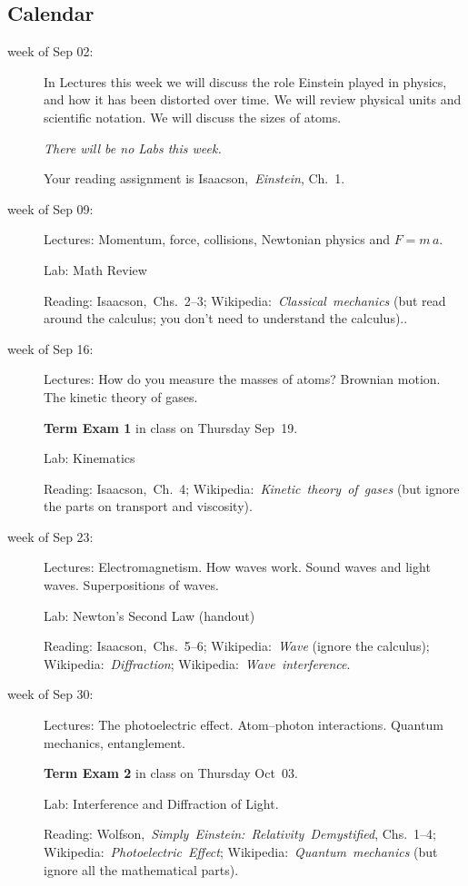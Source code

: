 \documentclass[12pt, letterpaper]{article}
\begin{document}
\subsection*{Calendar}\raggedright
\begin{description}
\item[week of Sep 02:] In Lectures this week we will discuss the role
  Einstein played in physics, and how it has been distorted over
  time.
  We will review physical units and scientific notation.
  We will discuss the sizes of atoms.

  \textsl{There will be no Labs this week.}

  Your reading assignment is
  Isaacson,~\textit{Einstein}, Ch.~1.

\item[week of Sep 09:] Lectures: Momentum, force, collisions,
  Newtonian physics and $F=m\,a$.

  Lab: Math Review

  Reading: Isaacson,~Chs.~2--3;
  Wikipedia:~\textit{Classical~mechanics} (but read around the
  calculus; you don't need to understand the calculus)..

\item[week of Sep 16:] Lectures: How do you measure the masses of
  atoms? Brownian motion. The kinetic theory of gases.

  \textbf{Term Exam 1} in class on Thursday Sep~19.

  Lab: Kinematics

  Reading: Isaacson,~Ch.~4;
  Wikipedia:~\textit{Kinetic~theory~of~gases} (but ignore the parts on
  transport and viscosity).

\item[week of Sep 23:] Lectures: Electromagnetism. How waves
  work. Sound waves and light waves. Superpositions of waves.

  Lab: Newton's Second Law (handout)

  Reading:
  Isaacson,~Chs.~5--6;
  Wikipedia:~\textit{Wave} (ignore the calculus);
  Wikipedia:~\textit{Diffraction};
  Wikipedia:~\textit{Wave~interference}.

\item[week of Sep 30:] Lectures: The photoelectric effect.
  Atom--photon interactions. Quantum mechanics, entanglement.

  \textbf{Term Exam 2} in class on Thursday Oct~03.

  Lab: Interference and Diffraction of Light.

  Reading:
  Wolfson,~\textit{Simply~Einstein:~Relativity~Demystified}, Chs.~1--4;
  Wikipedia:~\textit{Photoelectric~Effect};
  Wikipedia:~\textit{Quantum~mechanics} (but ignore all the mathematical parts).


\end{description}
\end{document}
